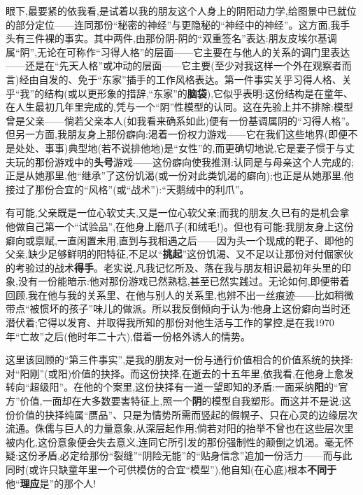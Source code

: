 眼下,最要紧的依我看,是试着以我的朋友这个人身上的阴阳动力学,给图景中已就位的部分定位——连同那份“秘密的神经”与更隐秘的“神经中的神经”。这方面,我手头有三件裸的事实。其中两件,由那份阴-阴的“双重签名”表达:朋友皮埃尔基调属“阴”,无论在可称作“习得人格”的层面——它主要在与他人的关系的调门里表达——还是在“先天人格”或冲动的层面——它主要(至少对我这样一个外在观察者而言)经由自发的、免于“东家”插手的工作风格表达。第一件事实关乎习得人格、关乎“我”的结构(或以更形象的措辞,“东家”的\textbf{脑袋}),它似乎表明:这份结构是在童年、在人生最初几年里完成的,凭与一个“阴”性模型的认同。这在先验上并不排除:模型曾是父亲——倘若父亲本人(如我看来确系如此\dmark{})便有一份基调属阴的“习得人格”。但另一方面,我朋友身上那份癖向:渴着一份权力游戏——它在我们这些地界(即便不是处处、事事)典型地(若不说排他地)是“女性”的,而更确切地说,它是妻子惯于与丈夫玩的那份游戏中的\textbf{头号}游戏——这份癖向使我推测:认同是与母亲这个人完成的;正是从她那里,他“继承”了这份饥渴(或一份对此类饥渴的癖向);也正是从她那里,他接过了那份合宜的“风格”(或“战术”):“天鹅绒中的利爪”。

有可能,父亲既是一位心软丈夫,又是一位心软父亲;而我的朋友,久已有的是机会拿他做自己第一个“试验品”,在他身上磨爪子(和绒毛!)。但也有可能:我朋友身上这份癖向或禀赋,一直闲置未用,直到与我相遇之后——因为头一个现成的靶子、即他的父亲,缺少足够鲜明的阳特征,不足以“\textbf{挑起}”这份饥渴、又不足以让那份对付倔家伙的考验过的战术\textbf{得手}。老实说,凡我记忆所及、落在我与朋友相识最初年头里的印象,没有一份能暗示:他对那份游戏已然熟稔,甚至已然实践过。无论如何,即便带着回顾,我在他与我的关系里、在他与别人的关系里,也辨不出一丝痕迹——比如稍微带点“被惯坏的孩子”味儿的做派。所以我反倒倾向于认为:他身上这份癖向当时还潜伏着;它得以发育、并取得我所知的那份对他生活与工作的掌控,是在我1970年“亡故”之后(他时年二十六),借着一份格外诱人的情势。

这里该回顾的“第三件事实”,是我的朋友对一份与通行价值相合的价值系统的抉择:对“阳刚”(或阳)价值的抉择。而这份抉择,在逝去的十五年里,依我看,在他身上愈发转向“超级阳”。在他的个案里,这份抉择有一道一望即知的矛盾:一面采纳\textbf{阳}的“官方”价值,一面却在大多数要害特征上,照一个\textbf{阴}的模型自我塑形。而这并不是说:这份价值的抉择纯属“赝品”、只是为情势所需而竖起的假幌子、只在心灵的边缘层次\dmark{}流通。侏儒与巨人的力量意象,从深层起作用;倘若对阳的抬举不曾也在这些层次里被内化,这份意象便会失去意义,连同它所引发的那份强制性的颠倒之饥渴。毫无怀疑:这份矛盾,必定给那份“裂缝”“阴险无能”的“贴身信念”追加一份活力——而与此同时(或许只缺童年里一个可供模仿的合宜“模型”),他自知(在心底)根本\textbf{不同于}他“\textbf{理应}是”的那个人!

